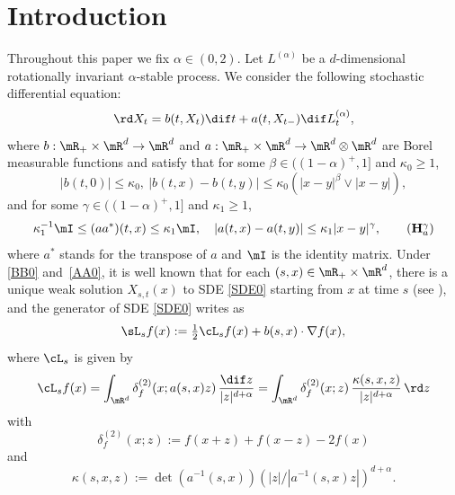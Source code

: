 \section{Introduction}

Throughout this paper we fix $\alpha\in(0,2)$. Let $L^{(\alpha)}$ be a $d$-dimensional rotationally invariant $\alpha$-stable process.
We consider the following stochastic differential equation:
\begin{equation}\label{SDE0}
\rd X_t=b(t,X_t)\dif t+a(t,X_{t-})\dif L^{(\alpha)}_t,
\end{equation}
where $b:\mR_+\times\mR^d\to\mR^d$ and $a:\mR_+\times\mR^d\to\mR^d\otimes\mR^d$ are Borel measurable functions and satisfy
that for some $\beta\in((1-\alpha)^+,1]$ and $\kappa_0\geq 1$,
\begin{equation}\label{BB0}
|b(t,0)|\le \kappa_0,\ |b(t,x)-b(t,y)|\leq\kappa_0(|x-y|^\beta\vee|x-y|),\tag{$\mathbf H^\beta_b$}
\end{equation}
and
for some $\gamma\in((1-\alpha)^+,1]$ and $\kappa_1\geq 1$,
\begin{equation}\label{AA0}
\kappa_1^{-1}\mI\leq (aa^*)(t,x)\leq\kappa_1\mI,\quad |a(t,x)-a(t,y)|\leq\kappa_1|x-y|^{\gamma}, \tag{$\mathbf H^{\gamma}_a$}
\end{equation}
where $a^*$ stands for the transpose of $a$ and $\mI$ is the identity matrix.
Under \eqref{BB0} and~\eqref{AA0}, it is well known that
for each $(s,x)\in\mR_+\times\mR^d$,
there is a unique weak solution
$X_{s,t}(x)$ to SDE \eqref{SDE0} starting from $x$ at time $s$ (see \eg \cite[Th.\,1.1]{CZZ}),
and the generator of SDE \eqref{SDE0} writes as
\begin{equation*}
\sL_{s} f(x):=\tfrac12\cL_{s} f(x)+b(s,x)\cdot\nabla f(x),
\end{equation*}
where $\cL_{s}$ is given by\vspace*{-3pt}
\begin{equation}\label{GEN_STABLE_LIKE}
\cL_{s} f(x)=\int_{\mR^d}\delta^{(2)}_f(x;a(s,x)z)\,\frac{\dif z}{|z|^{d+\alpha}}=\int_{\mR^d}\delta^{(2)}_f(x;z)\,\frac{\kappa(s,x,z)}{|z|^{d+\alpha}}\,\rd z
\end{equation}
with\vspace*{-3pt}
\begin{equation}\label{DEF_DELTA_2}
\delta^{(2)}_f(x;z):=f(x+z)+f(x-z)-2f(x)
\end{equation}
and\vspace*{-3pt}
\begin{equation}\label{KA1}
\kappa(s,x,z):=\det(a^{-1}(s,x))(|z|/|a^{-1}(s,x)z|)^{d+\alpha}.
\end{equation}
